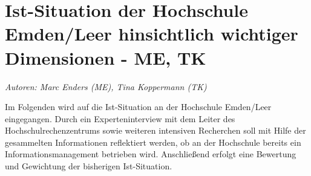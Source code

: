 \chapter{Ist-Situation der Hochschule Emden/Leer hinsichtlich wichtiger Dimensionen - ME, TK}
\textit{Autoren: Marc Enders (ME), Tina Koppermann (TK)}

Im Folgenden wird auf die Ist-Situation an der Hochschule Emden/Leer eingegangen. Durch ein 
Experteninterview mit dem Leiter des Hochschulrechenzentrums sowie weiteren intensiven Recherchen soll 
mit Hilfe der gesammelten Informationen reflektiert werden, ob an der Hochschule bereits ein 
Informationsmanagement betrieben wird. Anschließend erfolgt eine Bewertung und Gewichtung der 
bisherigen Ist-Situation.







